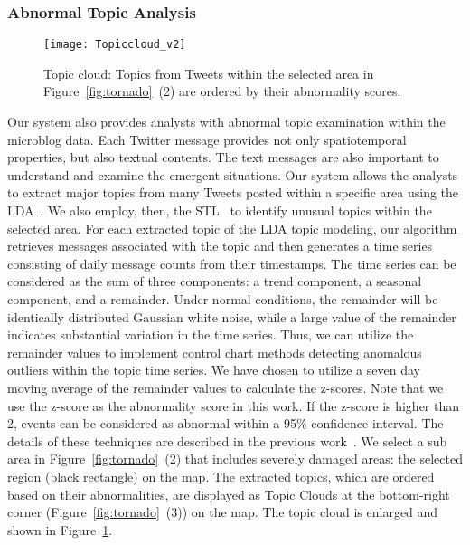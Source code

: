 \subsubsection{Abnormal Topic Analysis}
\label{sec:abnormal_topic_analysis}
\begin{figure}[tb]
\centering
\texttt{[image: Topiccloud\_v2]}
\caption{Topic cloud: Topics from Tweets within the selected area in Figure~\ref{fig:tornado}~(2) are ordered by their abnormality scores.}
\label{fig:topic_cloud}
\end{figure}

Our system also provides analysts with abnormal topic examination within the microblog data.
Each Twitter message provides not only spatiotemporal properties, but also textual contents.
The text messages are also important to understand and examine the emergent situations.
Our system allows the analysts to extract major topics from many Tweets posted within a specific area using the LDA~\cite{Blei:2003:LDA}.
We also employ, then, the STL~\cite{Cleveland:1990:SAS} to identify unusual topics within the selected area.
For each extracted topic of the LDA topic modeling, our algorithm retrieves messages associated with the topic and then generates a time series consisting of daily message counts from their timestamps.
The time series can be considered as the sum of three components: a trend component, a seasonal component, and a remainder.
Under normal conditions, the remainder will be identically distributed Gaussian white noise, while a large value of the remainder indicates substantial variation in the time series.
Thus, we can utilize the remainder values to implement control chart methods detecting anomalous outliers within the topic time series.
We have chosen to utilize a seven day moving average of the remainder values to calculate the z-scores.
Note that we use the z-score as the abnormality score in this work.
If the z-score is higher than 2, events can be considered as abnormal within a 95\% confidence interval.
The details of these techniques are described in the previous work~\cite{CHAE:2012:SSM}.
We select a sub area in Figure~\ref{fig:tornado}~(2) that includes severely damaged areas: the selected region (black rectangle) on the map.
The extracted topics, which are ordered based on their abnormalities, are displayed as Topic Clouds at the bottom-right corner (Figure~\ref{fig:tornado}~(3)) on the map.
The topic cloud is enlarged and shown in Figure~\ref{fig:topic_cloud}.
